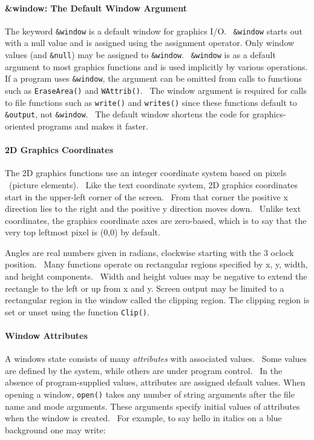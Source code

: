 \paragraph{\&window: The Default Window Argument}

The keyword \texttt{\&window} is a default window for graphics I/O.
\ \texttt{\&window} starts out with a null value and is assigned using
the assignment operator. Only window values (and \texttt{\&null}) may
be assigned to \texttt{\&window}. \ \texttt{\&window} is as a default
argument to most graphics functions and is used implicitly by various
operations. If a program uses \texttt{\&window}, the argument can be
omitted from calls to functions such as \texttt{EraseArea()} and
\texttt{WAttrib()}. \ The window argument is required for calls to file
functions such as \texttt{write()} and \texttt{writes()} since these
functions default to \texttt{\&output}, not \texttt{\&window}. \ The
default window shortens the code for graphics-oriented programs and
makes it faster.

\paragraph{2D Graphics Coordinates}

The 2D graphics functions use an integer coordinate system based on
pixels \ (picture elements). \ Like the text coordinate system, 2D
graphics coordinates start in the upper-left corner of the screen.
\ From that corner the positive x direction lies to the right and the
positive y direction moves down. \ Unlike text coordinates, the
graphics coordinate axes are zero-based, which is to say that the very
top leftmost pixel is (0,0) by default.

Angles are real numbers given in radians, clockwise starting with the 3
o{\textquotesingle}clock position. \ Many functions operate on
rectangular regions specified by x, y, width, and height components.
\ Width and height values may be negative to extend the rectangle to
the left or up from x and y. Screen output may be limited to a
rectangular region in the window called the clipping region. The
clipping region is set or unset using the function \texttt{Clip()}.

\paragraph{Window Attributes}
A window{\textquotesingle}s state consists of many \textit{attributes}
with associated values. \ Some values are defined by the system, while
others are under program control. \ In the absence of program-supplied
values, attributes are assigned default values. When opening a window,
\texttt{open()} takes any number of string arguments after the file
name and mode arguments. These arguments specify initial values of
attributes when the window is created. \ For example, to say hello in
italics on a blue background one may write:


